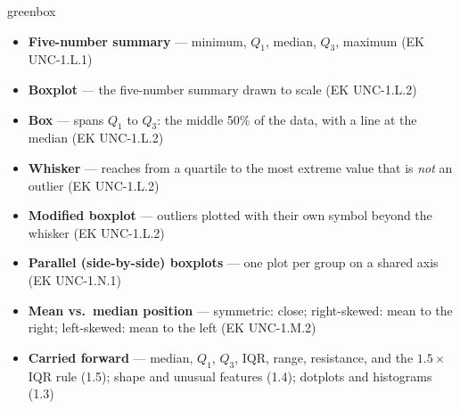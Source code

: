\documentclass[10pt]{article}
\begin{document}
\boxguard
\begin{skillbox}{greenbox}
\begin{minipage}[t]{0.48\linewidth}
    \begin{itemize}
        \item \textbf{Five-number summary} --- minimum, $Q_1$, median, $Q_3$, maximum
              (EK UNC-1.L.1)
        \item \textbf{Boxplot} --- the five-number summary drawn to scale (EK UNC-1.L.2)
        \item \textbf{Box} --- spans $Q_1$ to $Q_3$: the middle 50\% of the data, with a line at
              the median (EK UNC-1.L.2)
        \item \textbf{Whisker} --- reaches from a quartile to the most extreme value that is
              \emph{not} an outlier (EK UNC-1.L.2)
    \end{itemize}
\end{minipage}
\hfill
\begin{minipage}[t]{0.48\linewidth}
    \begin{itemize}
        \item \textbf{Modified boxplot} --- outliers plotted with their own symbol beyond the
              whisker (EK UNC-1.L.2)
        \item \textbf{Parallel (side-by-side) boxplots} --- one plot per group on a shared axis
              (EK UNC-1.N.1)
        \item \textbf{Mean vs.\ median position} --- symmetric: close; right-skewed: mean to the
              right; left-skewed: mean to the left (EK UNC-1.M.2)
        \item \textbf{Carried forward} --- median, $Q_1$, $Q_3$, IQR, range, resistance, and the
              $1.5\times$IQR rule (1.5); shape and unusual features (1.4); dotplots and
              histograms (1.3)
    \end{itemize}
\end{minipage}
\end{skillbox}
\end{document}
